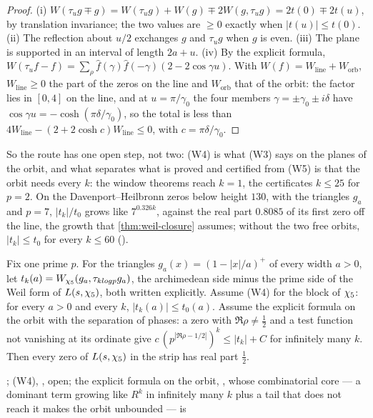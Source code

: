 \begin{proof}
(i) $W(\tau_ug\mp g)=W(\tau_ug)+W(g)\mp2W(g,\tau_ug)=2t(0)\mp2t(u)$, by translation invariance; the two values are
$\ge0$ exactly when $|t(u)|\le t(0)$.  (ii) The reflection about $u/2$ exchanges $g$ and $\tau_ug$ when $g$ is even.
(iii) The plane is supported in an interval of length $2a+u$.  (iv) By the explicit formula,
$W(\tau_uf-f)=\sum_\rho\hat f(\gamma)\hat f(-\gamma)(2-2\cos\gamma u)$.  With $W(f)=W_{\mathrm{line}}+W_{\mathrm{orb}}$, $W_{\mathrm{line}}\ge0$ the part of the
zeros on the line and $W_{\mathrm{orb}}$ that of the orbit: the factor lies in $[0,4]$ on the line, and at $u=\pi/\gamma_0$ the four
members $\gamma=\pm\gamma_0\pm i\delta$ have $\cos\gamma u=-\cosh(\pi\delta/\gamma_0)$, so the total is less than
$4W_{\mathrm{line}}-(2+2\cosh c)W_{\mathrm{line}}\le0$, with $c=\pi\delta/\gamma_0$.
\end{proof}

So the route has one open step, not two: \textup{(W4)} is what \textup{(W3)} says on the planes of the orbit, and
what separates what is proved and certified from \textup{(W5)} is that the orbit needs every $k$: the window theorems reach $k=1$, the certificates $k\le25$ for $p=2$.  On
the Davenport--Heilbronn zeros below height $130$, with the triangles $g_a$ and $p=7$, $|t_k|/t_0$ grows like
$7^{0.326k}$, against the real part $0.8085$ of its first zero off the line, the growth that
\cref{thm:weil-closure} assumes; without the two free orbits, $|t_k|\le t_0$ for every $k\le60$
().

\begin{theorem}\label{thm:weil-closure}
Fix one prime $p$.  For the triangles $g_a(x)=(1-|x|/a)^+$ of every width $a>0$, let
$t_k(a)=W_{\chi_5}(g_a,\tau_{klog p}g_a)$, the archimedean side minus the prime side of the Weil
form of $L(s,\chi_5)$, both written explicitly.  Assume \textup{(W4)} for the block of $\chi_5$: for
every $a>0$ and every $k$, $|t_k(a)|\le t_0(a)$.  Assume the explicit formula on the orbit with the separation of phases:
a zero with $\Re\rho\neq\tfrac12$ and a test function not vanishing at its ordinate give
$c\,(p^{|\Re\rho-1/2|})^k\le|t_k|+C$ for infinitely many $k$.  Then every zero of $L(s,\chi_5)$ in
the strip has real part $\tfrac12$.  %
\end{theorem}
{\raggedright \leavevmode{};
(W4), , open; the explicit formula on the orbit,
, whose combinatorial core --- a dominant term growing like
$R^k$ in infinitely many $k$ plus a tail that does not reach it makes the orbit unbounded --- is
\par}

